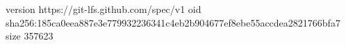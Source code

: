 version https://git-lfs.github.com/spec/v1
oid sha256:185ca0eea887e3e779932236341c4eb2b904677ef8ebe55accdea2821766bfa7
size 357623
